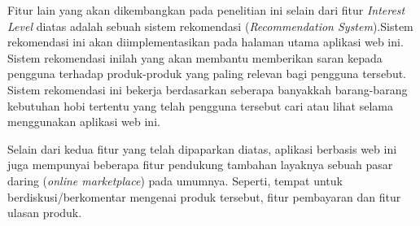 \documentclass[a4paper]{article}
\begin{document}

Fitur lain yang akan dikembangkan pada penelitian ini selain dari fitur \textit{Interest Level} diatas adalah sebuah sistem rekomendasi (\textit{Recommendation System}).Sistem rekomendasi ini akan diimplementasikan pada halaman utama aplikasi web ini. Sistem rekomendasi inilah yang akan membantu memberikan saran kepada pengguna terhadap produk-produk yang paling relevan bagi pengguna tersebut. Sistem rekomendasi ini bekerja berdasarkan seberapa banyakkah barang-barang kebutuhan hobi tertentu yang telah pengguna tersebut cari atau lihat selama menggunakan aplikasi web ini.

Selain dari kedua fitur yang telah dipaparkan diatas, aplikasi berbasis web ini juga mempunyai beberapa fitur pendukung tambahan layaknya sebuah pasar daring (\textit{online marketplace}) pada umumnya. Seperti, tempat untuk berdiskusi/berkomentar mengenai produk tersebut, fitur pembayaran dan fitur ulasan produk.
\end{document}
